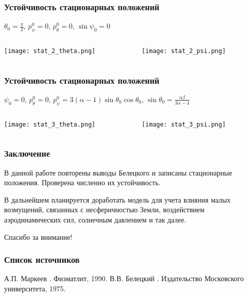 \documentclass[10pt,pdf,hyperref={unicode}]{beamer}
\begin{document}
\begin{frame}
\frametitle{Устойчивость стационарных положений}
	$\theta_0 = \frac{\pi}{2}$, $p_\psi^0 = 0$, $p_\theta^0 = 0$, $\sin \psi_0 = 0$
	
	\begin{columns}[onlytextwidth]
		\begin{column}{0.5\textwidth}
			\texttt{[image: stat\_2\_theta.png]}
		\end{column}
		\begin{column}{0.5\textwidth}
			\texttt{[image: stat\_2\_psi.png]}
		\end{column}
	\end{columns}
\end{frame}

\begin{frame}
\frametitle{Устойчивость стационарных положений}
	$\psi_0 = 0$, $p_\theta^0 = 0$, $p_\psi^0 = 3(\alpha - 1) \sin \theta_0 \cos \theta_0$, $\sin \theta_0 = \frac{\alpha\beta}{3 \alpha - 4}$
	
	\begin{columns}[onlytextwidth]
		\begin{column}{0.5\textwidth}
			\texttt{[image: stat\_3\_theta.png]}
		\end{column}
		\begin{column}{0.5\textwidth}
			\texttt{[image: stat\_3\_psi.png]}
		\end{column}
	\end{columns}
\end{frame}

\begin{frame}
\frametitle{Заключение}
	В данной работе повторены выводы Белецкого и записаны стационарные положения. Проверена численно их устойчивость.
	
	В дальнейшем планируется доработать модель для учета влияния малых возмущений, связанных с несферичностью Земли, воздействием аэродинамических сил, солнечным давлением и так далее.
\end{frame}

\begin{frame}
	\begin{center}
		Спасибо за внимание!
	\end{center}
\end{frame}

\begin{frame}
\frametitle{Список источников}    
	\begin{thebibliography}{10}    
		\beamertemplatebookbibitems
		А.П. Маркеев
		.
		\newblock Физматлит, 1990.    
		\beamertemplatebookbibitems
		В.В. Белецкий
		.
		\newblock Издательство Московского университета, 1975.
	\end{thebibliography}
\end{frame}
\end{document}

